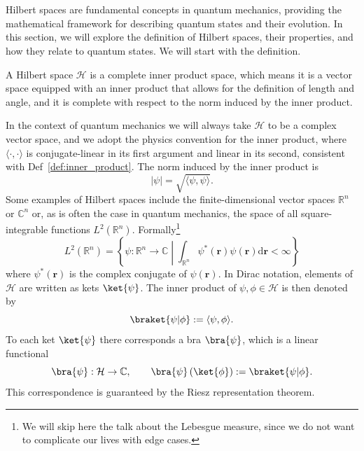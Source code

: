 \section{\filetotitle}\label{sec:hilbert_spaces_and_quantum_states}
Hilbert spaces are fundamental concepts in quantum mechanics, providing the mathematical framework for describing quantum states and their evolution. In this section, we will explore the definition of Hilbert spaces, their properties, and how they relate to quantum states. We will start with the definition.
\begin{definition}
A Hilbert space $\mathcal{H}$ is a complete inner product space, which means it is a vector space equipped with an inner product that allows for the definition of length and angle, and it is complete with respect to the norm induced by the inner product.
\end{definition}
In the context of quantum mechanics we will always take $\mathcal{H}$ to be a complex vector space, and we adopt the physics convention for the inner product, where $\langle\cdot,\cdot\rangle$ is conjugate-linear in its first argument and linear in its second, consistent with Def~\ref{def:inner_product}. The norm induced by the inner product is
\begin{equation}
\lvert\psi\rvert = \sqrt{\langle\psi,\psi\rangle}.
\end{equation}
Some examples of Hilbert spaces include the finite-dimensional vector spaces $\mathbb{R}^n$ or $\mathbb{C}^n$ or, as is often the case in quantum mechanics, the space of all square-integrable functions $L^2(\mathbb{R}^n)$. Formally\footnote{We will skip here the talk about the Lebesgue measure, since we do not want to complicate our lives with edge cases.}
\begin{equation}
L^2(\mathbb{R}^n)=\left\lbrace\psi :\mathbb{R}^n\to\mathbb{C}\middle\vert\int_{\mathbb{R}^n}\psi^*(\symbf{r})\psi(\symbf{r})\mathrm{d}\symbf{r}<\infty\right\rbrace
\end{equation}
where $\psi^*(\symbf{r})$ is the complex conjugate of $\psi(\symbf{r})$. In Dirac notation, elements of $\mathcal{H}$ are written as kets $\ket{\psi}$. The inner product of $\psi,\phi\in\mathcal{H}$ is then denoted by
\begin{equation}
\braket{\psi\vert\phi}:=\langle\psi,\phi\rangle.
\end{equation}
To each ket $\ket{\psi}$ there corresponds a bra $\bra{\psi}$, which is a linear functional
\begin{equation}
\bra{\psi} : \mathcal{H}\to\mathbb{C},\qquad\bra{\psi}\left(\ket{\phi}\right):=\braket{\psi|\phi}.
\end{equation}
This correspondence is guaranteed by the Riesz representation theorem.

